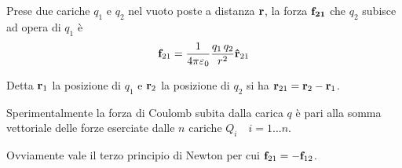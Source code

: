\begin{obses}
  Prese due cariche $q_1$ e $q_2$ nel vuoto poste a distanza $\vb{r}$, la forza $\vb{f_{21}}$ che $q_2$ subisce ad opera di $q_1$ è
  \begin{equation}
      \vb{f}_{21}=\frac{1}{4\pi\varepsilon_0}\frac{q_1\,q_2}{r^2}\vu{r}_{21}
  \end{equation}
\end{obses}
  Detta $\vb{r}_1$ la posizione di $q_1$ e $\vb{r}_2$ la posizione di $q_2$ si ha $\vb{r}_{21}=\vb{r}_2-\vb{r}_1$.
\begin{obses}
    Sperimentalmente la forza di Coulomb subita dalla carica $q$ è pari alla somma vettoriale delle forze eserciate dalle $n$ cariche $Q_i \quad i=1 \text{...} n$.
\end{obses}

Ovviamente vale il terzo principio di Newton per cui $\vb{f}_{21}=-\vb{f}_{12}$.
